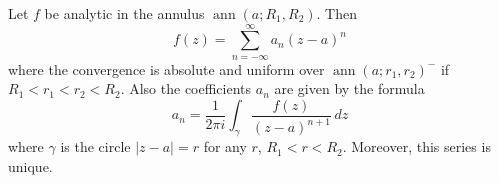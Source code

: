 Let $f$ be analytic in the annulus $\operatorname{ann}(a; R_1, R_2)$. Then
$$f(z) = \sum_{n=-\infty}^{\infty} a_n(z-a)^n$$
where the convergence is absolute and uniform over $\operatorname{ann}(a; r_1, r_2)^-$ if $R_1 < r_1 < r_2 < R_2$. Also the coefficients $a_n$ are given by the formula
$$a_n = \frac{1}{2\pi i} \int_{\gamma} \frac{f(z)}{(z-a)^{n+1}} \, dz$$
where $\gamma$ is the circle $|z-a| = r$ for any $r$, $R_1 < r < R_2$. Moreover, this series is unique.
